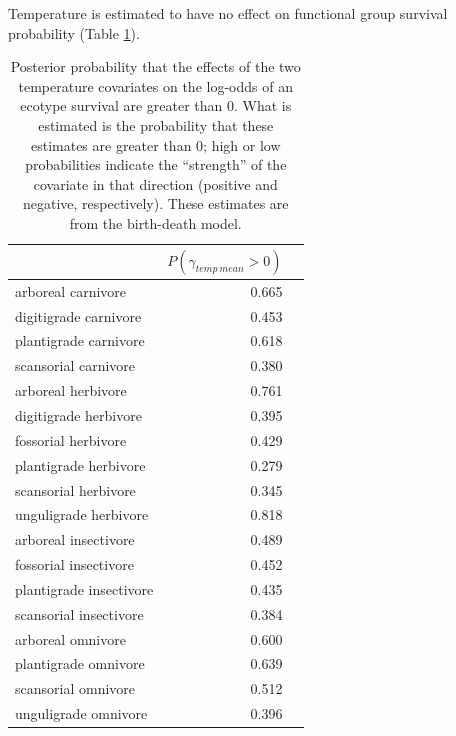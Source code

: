 \documentclass[12pt,letterpaper]{article}
\begin{document}
Temperature is estimated to have no effect on functional group survival probability (Table \ref{tab:surv_temp}). 
\begin{table}[ht]
  \centering
  \caption[Posterior probablity of effects of temperature on survival]{Posterior probability that the effects of the two temperature covariates on the log-odds of an ecotype survival are greater than 0. What is estimated is the probability that these estimates are greater than 0; high or low probabilities indicate the ``strength'' of the covariate in that direction (positive and negative, respectively). These estimates are from the birth-death model.}
  \label{tab:surv_temp}
  \begin{tabular}{ l r r }
    \hline
    & \(P(\gamma_{temp\ mean} > 0)\) \\
    \hline
    arboreal carnivore & 0.665 \\ 
    digitigrade carnivore & 0.453 \\ 
    plantigrade carnivore & 0.618 \\ 
    scansorial carnivore & 0.380 \\ 
    arboreal herbivore & 0.761 \\ 
    digitigrade herbivore & 0.395 \\ 
    fossorial herbivore & 0.429 \\ 
    plantigrade herbivore & 0.279 \\ 
    scansorial herbivore & 0.345 \\ 
    unguligrade herbivore & 0.818 \\ 
    arboreal insectivore & 0.489 \\ 
    fossorial insectivore & 0.452 \\ 
    plantigrade insectivore & 0.435 \\ 
    scansorial insectivore & 0.384 \\ 
    arboreal omnivore & 0.600 \\ 
    plantigrade omnivore & 0.639 \\ 
    scansorial omnivore & 0.512 \\ 
    unguligrade omnivore & 0.396 \\ 
    \hline
  \end{tabular}
\end{table}
\end{document}

